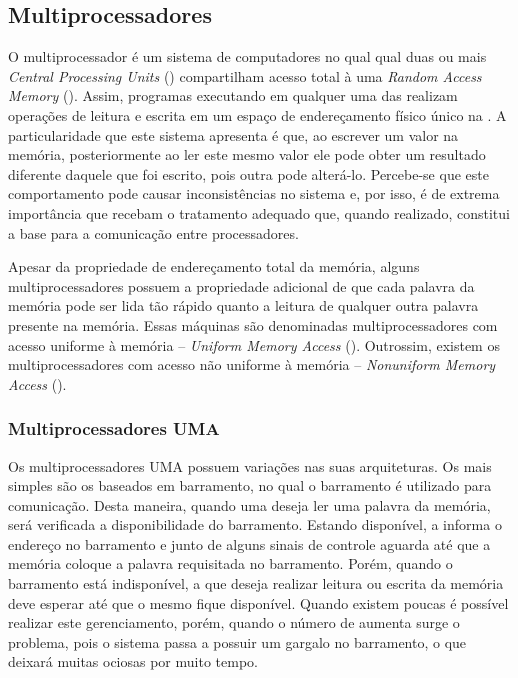 \subsection{Multiprocessadores}
\label{subsec:multiprocessadores}

O multiprocessador é um sistema de computadores no qual qual duas ou mais \textit{Central Processing Units} (\cpus) compartilham acesso total à uma \textit{Random Access Memory} (\ram). Assim, programas executando em qualquer uma das \cpus realizam operações de leitura e escrita em um espaço de endereçamento físico único na \ram. A particularidade que este sistema apresenta é que, ao escrever um valor na memória, posteriormente ao ler este mesmo valor ele pode obter um resultado diferente daquele que foi escrito, pois outra \cpu pode alterá-lo. Percebe-se que este comportamento pode causar inconsistências no sistema e, por isso, é de extrema importância que recebam o tratamento adequado que, quando realizado, constitui a base para a comunicação entre processadores.

Apesar da propriedade de endereçamento total da memória, alguns multiprocessadores possuem a propriedade adicional de que cada palavra da memória pode ser lida tão rápido quanto a leitura de qualquer outra palavra presente na memória. Essas máquinas são denominadas multiprocessadores com acesso uniforme à memória -- \textit{Uniform Memory Access} (\uma). Outrossim, existem os multiprocessadores com acesso não uniforme à memória -- \textit{Nonuniform Memory Access} (\numa).

\subsubsection{Multiprocessadores UMA}
\label{subsubsec:hw-multiprocessadores-uma}

Os multiprocessadores UMA possuem variações nas suas arquiteturas. Os mais simples são os baseados em barramento, no qual o barramento é utilizado para comunicação. Desta maneira, quando uma \cpu deseja ler uma palavra da memória, será verificada a disponibilidade do barramento. Estando disponível, a \cpu informa o endereço no barramento e junto de alguns sinais de controle aguarda até que a memória coloque a palavra requisitada no barramento. Porém, quando o barramento está indisponível, a \cpu que deseja realizar leitura ou escrita da memória deve esperar até que o mesmo fique disponível. Quando existem poucas \cpus é possível realizar este gerenciamento, porém, quando o número de \cpus aumenta surge o problema, pois o sistema passa a possuir um gargalo no barramento, o que deixará muitas \cpus ociosas por muito tempo.

